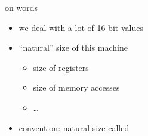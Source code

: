 \begin{frame}{on words}
    \begin{itemize}
    \item we deal with a lot of 16-bit values
    \item ``natural'' size of this machine
            \begin{itemize}
            \item size of registers
            \item size of memory accesses
            \item \ldots
            \end{itemize}
    \vspace{.5cm}
    \item convention: natural size called 
    \end{itemize}
\end{frame}

